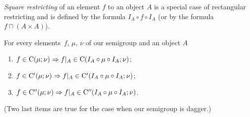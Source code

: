 \emph{Square restricting} of an element
$f$ to an object $A$ is a special case of rectangular restricting
and is defined by the formula $I_{A}\circ f\circ I_{A}$ (or by the
formula $f\sqcap(A\times A)$).
\begin{thm}
\label{rect-cont}For every elements~$f$, $\mu$, $\nu$ of our semigroup
and an object $A$
\begin{enumerate}
\item \label{contrestr-C}$f\in\mathrm{C}(\mu;\nu)\Rightarrow f|_{A}\in\mathrm{C}(I_{A}\circ\mu\circ I_{A};\nu)$;
\item \label{contrestr-Ci}$f\in\mathrm{C}'(\mu;\nu)\Rightarrow f|_{A}\in\mathrm{C}'(I_{A}\circ\mu\circ I_{A};\nu)$;
\item \label{contrestr-Cii}$f\in\mathrm{C}''(\mu;\nu)\Rightarrow f|_{A}\in\mathrm{C}''(I_{A}\circ\mu\circ I_{A};\nu)$. 
\end{enumerate}

(Two last items are true for the case when our semigroup is dagger.)

\end{thm}
